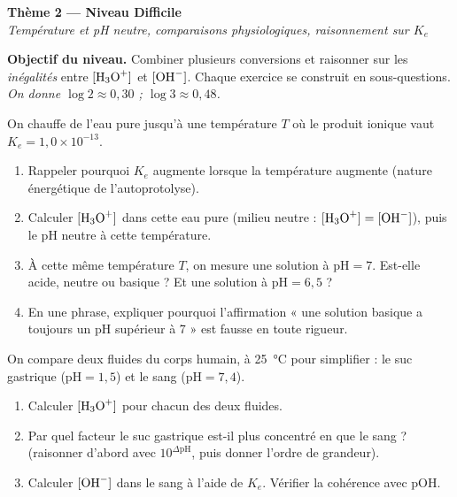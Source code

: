 \documentclass[11pt,a4paper]{article}
\begin{document}
\begin{center}
{\LARGE\bfseries\color{primarydark} Thème 2 --- Niveau Difficile}\\[2pt]
{\color{primary}\itshape Température et pH neutre, comparaisons physiologiques, raisonnement sur $K_e$}
\end{center}

\begin{consigne}
\textbf{Objectif du niveau.} Combiner plusieurs conversions et raisonner sur les \emph{inégalités} entre
$[\ce{H3O+}]$ et $[\ce{OH-}]$. Chaque exercice se construit en sous-questions. \emph{On donne
$\log 2\approx0{,}30$ ; $\log 3\approx0{,}48$.}
\end{consigne}

\begin{exobox}
On chauffe de l'eau pure jusqu'à une température $T$ où le produit ionique vaut $K_e = 1{,}0\times10^{-13}$.
\begin{enumerate}[label=\alph*),leftmargin=1.6em,itemsep=2pt]
  \item Rappeler pourquoi $K_e$ augmente lorsque la température augmente (nature énergétique de
        l'autoprotolyse).
  \item Calculer $[\ce{H3O+}]$ dans cette eau pure (milieu neutre : $[\ce{H3O+}]=[\ce{OH-}]$), puis le
        $\mathrm{pH}$ neutre à cette température.
  \item À cette même température $T$, on mesure une solution à $\mathrm{pH}=7$. Est-elle acide, neutre ou
        basique ? Et une solution à $\mathrm{pH}=6{,}5$ ?
  \item En une phrase, expliquer pourquoi l'affirmation « une solution basique a toujours un pH supérieur à
        7 » est fausse en toute rigueur.
\end{enumerate}
\end{exobox}

\begin{exobox}
On compare deux fluides du corps humain, à \SI{25}{\celsius} pour simplifier : le suc gastrique
($\mathrm{pH}=1{,}5$) et le sang ($\mathrm{pH}=7{,}4$).
\begin{enumerate}[label=\alph*),leftmargin=1.6em,itemsep=2pt]
  \item Calculer $[\ce{H3O+}]$ pour chacun des deux fluides.
  \item Par quel facteur le suc gastrique est-il plus concentré en  que le sang ? (raisonner d'abord
        avec $10^{\Delta\mathrm{pH}}$, puis donner l'ordre de grandeur).
  \item Calculer $[\ce{OH-}]$ dans le sang à l'aide de $K_e$. Vérifier la cohérence avec $\mathrm{pOH}$.
\end{enumerate}
\end{exobox}
\end{document}
